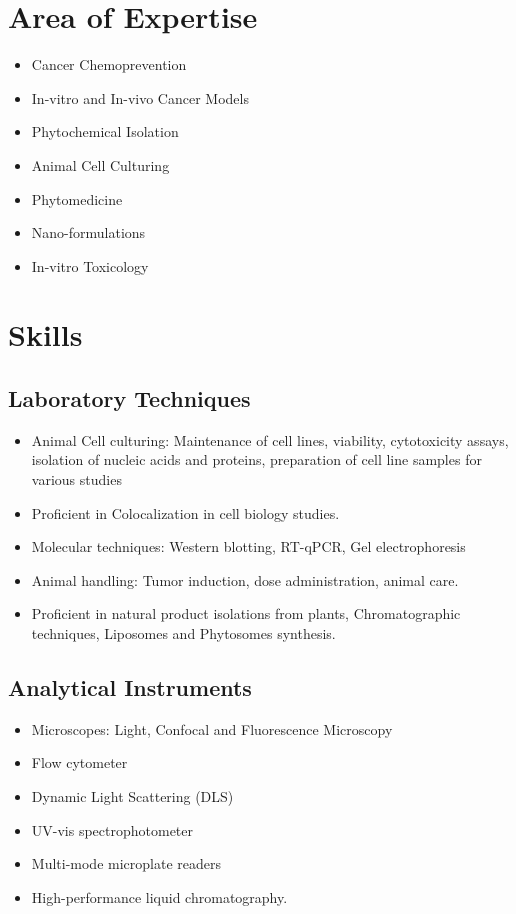 \documentclass[11pt,a4paper]{article}
\begin{document}
\vspace{0.5cm}

\section*{Area of Expertise}
\begin{itemize}
	\item Cancer Chemoprevention
	\item In-vitro and In-vivo Cancer Models
	\item Phytochemical Isolation
	\item Animal Cell Culturing
	\item Phytomedicine
	\item Nano-formulations
	\item In-vitro Toxicology
	
\end{itemize}

\vspace{0.5cm}

\section*{Skills}
\subsection*{Laboratory Techniques}
\begin{itemize}
	\item Animal Cell culturing: Maintenance of cell lines, viability, cytotoxicity assays, isolation of nucleic acids and proteins, preparation of cell line samples for various studies
	\item Proficient in Colocalization in cell biology studies.
	\item Molecular techniques: Western blotting, RT-qPCR, Gel electrophoresis
	\item Animal handling: Tumor induction, dose administration, animal care.
	\item Proficient in natural product isolations from plants, Chromatographic techniques, Liposomes and Phytosomes synthesis.
\end{itemize}
 
 \subsection*{Analytical Instruments}
\begin{itemize}
	\item  Microscopes: Light, Confocal and Fluorescence Microscopy
	\item Flow cytometer
	\item Dynamic Light Scattering (DLS) 
	\item UV-vis spectrophotometer 
	\item Multi-mode microplate readers 
	\item High-performance liquid chromatography.
\end{itemize}
\end{document}
